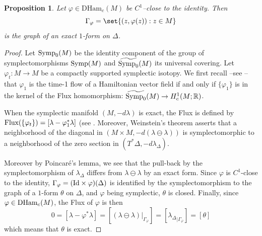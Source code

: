 \documentclass{article}
\newcommand{\1}{\mathbbm{1}}
\newtheorem{prp}[thm]{Proposition}
\theoremstyle{remark}
\renewcommand{\phi}{\varphi}
\begin{document}
{{\begin{prp}
Let $\varphi\in\mathrm{DHam}_c(M)$ be $C^1$--close to the identity. Then
$$\Gamma_\varphi = \set{(z,\varphi(z)): z \in M}$$
is the graph of an exact $1$-form on $\Delta$.
\end{prp}

\begin{proof} Let $\textnormal{Symp}_0(M)$ be the identity component of the group of symplectomorphisms $\textnormal{Symp}(M)$ and $\widetilde{\textnormal{Symp}_0}(M)$ its universal covering. Let $\varphi_t : M \to M$ be a compactly supported symplectic isotopy. We first recall --see \cite[Theorem 10.2.5]{mcDSal16}-- that $\varphi_1$ is the time-1 flow of a Hamiltonian vector field if and only if $\{\varphi_1\}$ is in the kernel of the Flux homomorphism: $\widetilde{\textnormal{Symp}_0}(M) \to H^1_c(M;\mathbb R)$. 

When the symplectic manifold $(M,-d\lambda)$ is exact, the Flux is defined by $\textnormal{Flux}(\{\varphi_t\}) =  [\lambda-\varphi^*_1\lambda]$ (see \cite[Lemma 10.2.7]{mcDSal16}. Moreover, Weinstein's theorem \cite[Theorem 3.4.13]{mcDSal16} asserts that a neighborhood of the diagonal in $(M \times M, -d(\lambda\ominus \lambda))$ is symplectomorphic to a neighborhood of the zero section in $(T^*\Delta, -d\lambda_\Delta)$. 

Moreover  by Poincaré's lemma, we see that the pull-back by the symplectomorphism  of  $\lambda_\Delta$ differs from $\lambda\ominus \lambda$ by an exact form.
Since $\varphi$ is $C^1$-close to the identity, $\Gamma_\varphi= (\textnormal{Id}\times\varphi)(\Delta)$ is identified by the symplectomorphism to the graph of a $1$-form $\theta$ on $\Delta$, and $\varphi$ being symplectic, $\theta$ is closed. Finally, since $\varphi \in \textnormal{DHam}_c(M)$, the Flux of $\phi$ is then $$0 = [\lambda - \varphi^*\lambda] = [ (\lambda \ominus \lambda)|_{\Gamma_\varphi}] = [{\lambda_{\Delta}}_{\mid \Gamma_{\varphi}}]=[\theta]$$ which means that $\theta$ is exact. 
\end{proof}

}}
\end{document}
